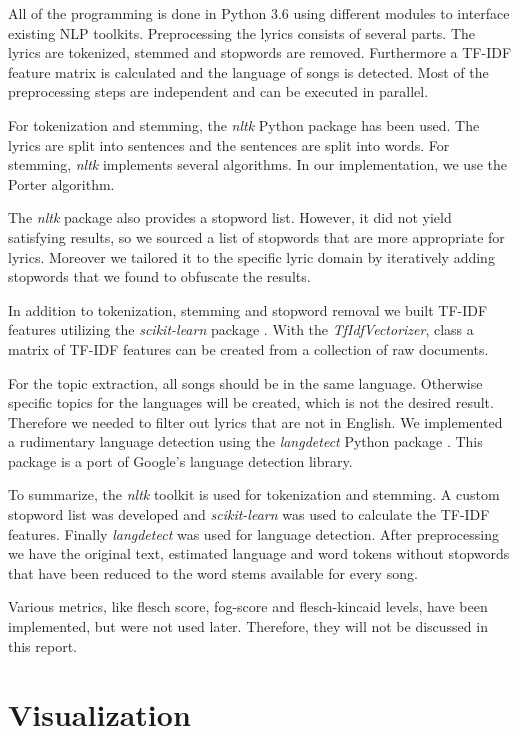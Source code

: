 \documentclass[10pt,a4paper]{article}
\begin{document}
	All of the programming is done in Python 3.6 using different modules to interface existing NLP toolkits. Preprocessing the lyrics consists of several parts. The lyrics are tokenized, stemmed and stopwords are removed. Furthermore a TF-IDF feature matrix is calculated and the language of songs is detected. Most of the preprocessing steps are independent and can be executed in parallel. 
	
	For tokenization and stemming, the \textit{nltk} Python package \cite{nltk} has been used. The lyrics are split into sentences and the sentences are split into words. For stemming, \textit{nltk} implements several algorithms. In our implementation, we use the Porter algorithm.  
	
	The \textit{nltk} package also provides a stopword list. However, it did not yield satisfying results, so we sourced a list of stopwords that are more appropriate for lyrics. Moreover we tailored it to the specific lyric domain by iteratively adding stopwords that we found to obfuscate the results.
	
	In addition to tokenization, stemming and stopword removal we built TF-IDF features utilizing the \textit{scikit-learn} package \cite{scikit-learn}. With the \textit{TfIdfVectorizer}, class a matrix of TF-IDF features can be created from a collection of raw documents. 
	
	For the topic extraction, all songs should be in the same language. Otherwise specific topics for the languages will be created, which is not the desired result. Therefore we needed to filter out lyrics that are not in English. We implemented a rudimentary language detection using the \textit{langdetect} Python package \cite{langdetect}. This package is a port of Google's language detection library.
	
	To summarize, the \textit{nltk} toolkit is used for tokenization and stemming. A custom stopword list was developed and \textit{scikit-learn} was used to calculate the TF-IDF features. Finally \textit{langdetect} was used for language detection. After preprocessing we have the original text, estimated language and word tokens without stopwords that have been reduced to the word stems available for every song.
	
	Various metrics, like flesch score, fog-score and flesch-kincaid levels, have been implemented, but were not used later. Therefore, they will not be discussed in this report.
	
	\section{Visualization}
	\label{sec:visualization}
	
\end{document}
